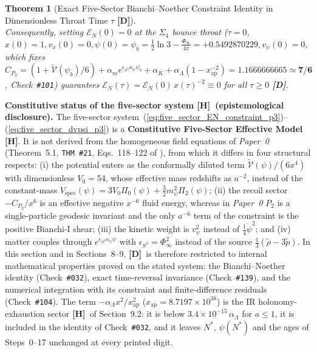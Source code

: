 \documentclass[11pt,a4paper]{article}
\newcommand{\catD}{\textbf{\textcolor{blue!75!black}{[D]}}}
\newcommand{\catH}{\textbf{\textcolor{orange!85!black}{[H]}}}
\theoremstyle{plain}
\newtheorem{theorem}{Theorem}[section]
\theoremstyle{definition}
\theoremstyle{remark}
\numberwithin{equation}{section}
\begin{document}
\begin{theorem}[Exact Five-Sector Bianchi--Noether Constraint Identity in Dimensionless Throat Time $\tau$ \catD]
\begin{equation}
  \label{eq:bianchi_noether_5sec_p3}
\end{equation}
Consequently, setting $\mathcal{E}_N(0) = 0$ at the $\Sigma_4$ bounce throat ($\tau = 0$, $x(0) = 1, v_x(0) = 0, \psi(0) = \psi_b = \frac{1}{2}\ln 3 - \frac{\Phi_{\infty}}{4\pi} = +0.5492870229, v_{\psi}(0) = 0$, which fixes $C_{P_2} = (1 + \widetilde{\mathcal{V}}(\psi_b)/6) + \alpha_m e^{\epsilon_{S^3}\kappa_{\psi}\psi_b} + \alpha_K + \alpha_{\Lambda}(1 - x_{\text{ap}}^{-2}) = \mathbf{1.1666666665 \simeq 7/6}$, Check~\texttt{\#101}) guarantees $\mathcal{E}_N(\tau) = \mathcal{E}_N(0)\,x(\tau)^{-2} \equiv 0$ for all $\tau \ge 0$ \catD.
\end{theorem}

\noindent\textbf{Constitutive status of the five-sector system \catH\ (epistemological disclosure).} The five-sector system~(\ref{eq:five_sector_EN_constraint_p3})--(\ref{eq:five_sector_dvpsi_p3}) is a \textbf{Constitutive Five-Sector Effective Model} \catH. It is not derived from the homogeneous field equations of \textit{Paper~0} (Theorem~5.1, \texttt{THM \#21}, Eqs.~118--122 of \cite{jimenez2026_p0}), from which it differs in four structural respects: (i) the potential enters as the conformally diluted term $\widetilde{\mathcal{V}}(\psi)/(6x^4)$ with dimensionless $V_0 = 54$, whose effective mass redshifts as $a^{-2}$, instead of the constant-mass $V_{\text{spec}}(\psi) = 3V_0\Pi_0(\psi) + \frac{3}{2}m_{\psi}^2\Pi_2(\psi)$; (ii) the recoil sector $-C_{P_2}/x^6$ is an effective negative $x^{-6}$ fluid energy, whereas in \textit{Paper~0} $P_2$ is a single-particle geodesic invariant and the only $a^{-6}$ term of the constraint is the positive Bianchi-I shear; (iii) the kinetic weight is $v_{\psi}^2$ instead of $\frac{1}{4}\dot{\psi}^2$; and (iv) matter couples through $e^{\epsilon_{S^3}\kappa_{\psi}\psi}$ with $\epsilon_{S^3} = \Phi_{\infty}^2$ instead of the source $\frac{1}{3}(\tilde{\rho} - 3\tilde{p})$. In this section and in Sections~8--9, \catD\ is therefore restricted to internal mathematical properties proved on the stated system: the Bianchi--Noether identity (Check~\texttt{\#032}), exact time-reversal invariance (Check~\texttt{\#139}), and the numerical integration with its constraint and finite-difference residuals (Check~\texttt{\#104}). The term $-\alpha_{\Lambda}x^2/x_{\text{ap}}^2$ ($x_{\text{ap}} = 8.7197 \times 10^{38}$) is the IR holonomy-exhaustion sector \catH\ of Section~9.2: it is below $3.4 \times 10^{-15}\,\alpha_{\Lambda}$ for $a \le 1$, it is included in the identity of Check~\texttt{\#032}, and it leaves $N^*$, $\psi(N^*)$ and the ages of Steps~0--17 unchanged at every printed digit.
\end{document}
